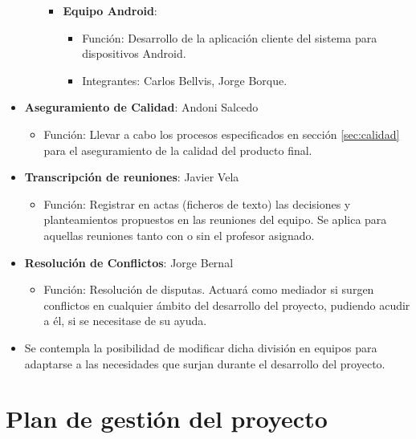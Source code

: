 \documentclass{article}
\begin{document}
\begin{itemize}
\begin{itemize}
\begin{itemize}
\begin{itemize}
           \end{itemize}
           \item \textbf{Equipo Android}:
           \begin{itemize}
               \setlength{\itemsep}{0em}
               \item Función: Desarrollo de la aplicación cliente del sistema para dispositivos Android.
               \item Integrantes: Carlos Bellvis, Jorge Borque.
           \end{itemize}
       \end{itemize}
   \end{itemize}
   \item \textbf{Aseguramiento de Calidad}: Andoni Salcedo
   \begin{itemize}
       \setlength{\itemsep}{0em}
       \item Función: Llevar a cabo los procesos especificados en sección \ref{sec:calidad} para el aseguramiento de la calidad del producto final.
   \end{itemize}
   \item \textbf{Transcripción de reuniones}: Javier Vela
   \begin{itemize}
       \setlength{\itemsep}{0em}
       \item Función: Registrar en actas (ficheros de texto) las decisiones y planteamientos propuestos en las reuniones del equipo. Se aplica para aquellas reuniones tanto con o sin el profesor asignado.
   \end{itemize}
   \item \textbf{Resolución de Conflictos}: Jorge Bernal
   \begin{itemize}
       \setlength{\itemsep}{0em}
       \item Función: Resolución de disputas. Actuará como mediador si surgen conflictos en cualquier ámbito del desarrollo del proyecto, pudiendo acudir a él, si se necesitase de su ayuda.
   \end{itemize}
   \item Se contempla la posibilidad de modificar dicha división en equipos para adaptarse a las necesidades que surjan durante el desarrollo del proyecto.
\end{itemize}
 
\pagebreak
 
\section{Plan de gestión del proyecto}
 
\end{document}
